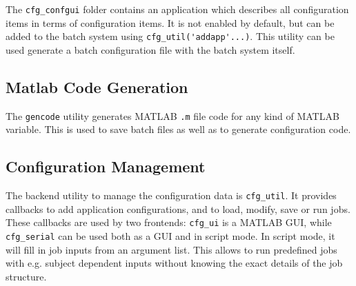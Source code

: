 The \verb|cfg_confgui| folder contains an application which describes all
configuration items in terms of configuration items. It is not enabled by
default, but can be added to the batch system using
\verb|cfg_util('addapp'...)|. This utility can be used generate a batch
configuration file with the batch system itself.

\subsection{Matlab Code Generation}

The \verb|gencode| utility generates MATLAB \verb|.m| file code for any kind
of MATLAB variable. This is used to save batch files as well as to generate
configuration code.

\subsection{Configuration Management}

The backend utility to manage the configuration data is \verb|cfg_util|. It
provides callbacks to add application configurations, and to load, modify,
save or run jobs. These callbacks are used by two frontends: \verb|cfg_ui| is
a MATLAB GUI, while \verb|cfg_serial| can be used both as a GUI and in script
mode. In script mode, it will fill in job inputs from an argument list. This
allows to run predefined jobs with e.g. subject dependent inputs without
knowing the exact details of the job structure.


